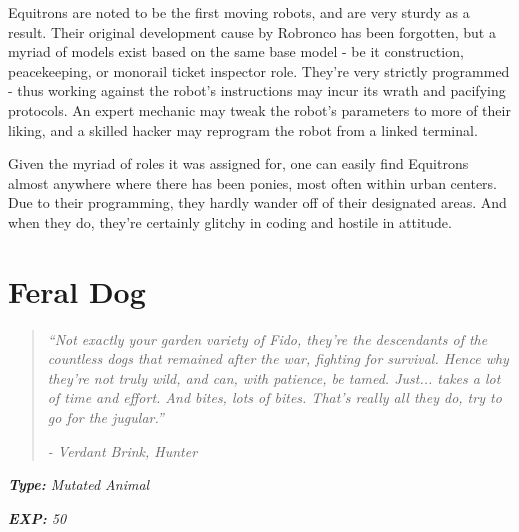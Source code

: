\documentclass[11pt,a4paper,twocolumn]{book}
\begin{document}
	Equitrons are noted to be the first moving robots, and are very sturdy as a result. Their original development cause by Robronco has been forgotten, but a myriad of models exist based on the same base model - be it construction, peacekeeping, or monorail ticket inspector role. They're very strictly programmed - thus working against the robot's instructions may incur its wrath and pacifying protocols. An expert mechanic may tweak the robot's parameters to more of their liking, and a skilled hacker may reprogram the robot from a linked terminal.
	
	\bigskip
	Given the myriad of roles it was assigned for, one can easily find Equitrons almost anywhere where there has been ponies, most often within urban centers. Due to their programming, they hardly wander off of their designated areas. And when they do, they're certainly glitchy in coding and hostile in attitude.
	
	\clearpage
	
	\section*{Feral Dog}
	\begin{quote}
		\emph{``Not exactly your garden variety of Fido, they're the descendants of the countless dogs that remained after the war, fighting for survival. Hence why they're not truly wild, and can, with patience, be tamed. Just... takes a lot of time and effort. And bites, lots of bites. That's really all they do, try to go for the jugular.''}
		
		\emph{-	Verdant Brink, Hunter}
	\end{quote}
	
	\emph{\textbf{Type:} Mutated Animal}
	
	\emph{\textbf{EXP:} 50}
	
%		
%	
%		
\end{document}

